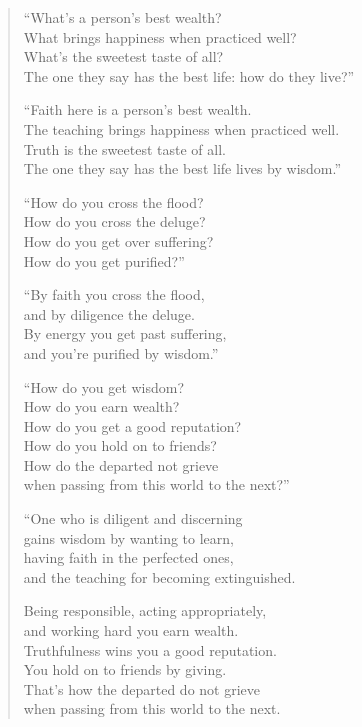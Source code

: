\documentclass[12pt,openany]{book}%
\begin{document}
\begin{verse}%
“What’s a person’s best wealth? \\
What brings happiness when practiced well? \\
What’s the sweetest taste of all? \\
The one they say has the best life: how do they live?” 

“Faith here is a person’s best wealth. \\
The teaching brings happiness when practiced well. \\
Truth is the sweetest taste of all. \\
The one they say has the best life lives by wisdom.” 

“How do you cross the flood? \\
How do you cross the deluge? \\
How do you get over suffering? \\
How do you get purified?” 

“By faith you cross the flood, \\
and by diligence the deluge. \\
By energy you get past suffering, \\
and you’re purified by wisdom.” 

“How do you get wisdom? \\
How do you earn wealth? \\
How do you get a good reputation? \\
How do you hold on to friends? \\
How do the departed not grieve \\
when passing from this world to the next?” 

“One who is diligent and discerning \\
gains wisdom by wanting to learn, \\
having faith in the perfected ones, \\
and the teaching for becoming extinguished. 

Being responsible, acting appropriately, \\
and working hard you earn wealth. \\
Truthfulness wins you a good reputation. \\
You hold on to friends by giving. \\
That’s how the departed do not grieve \\
when passing from this world to the next. 


\end{verse}
\end{document}

